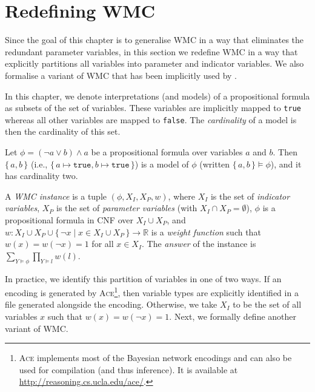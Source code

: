\section{Redefining WMC}

Since the goal of this chapter is to generalise WMC in a way that eliminates the
redundant parameter variables, in this section we redefine WMC in a way that
explicitly partitions all variables into parameter and indicator variables. We
also formalise a variant of WMC that has been implicitly used by
\citet{DBLP:conf/ijcai/ChaviraD05,DBLP:conf/sat/ChaviraD06}.

In this chapter, we denote interpretations (and models) of a propositional
formula as subsets of the set of variables. These variables are implicitly
mapped to \texttt{true} whereas all other variables are mapped to
\texttt{false}. The \emph{cardinality} of a model is then the cardinality of
this set.

\begin{example}
  Let $\phi = (\neg a \lor b) \land a$ be a propositional formula over variables
  $a$ and $b$. Then $\{\, a, b \,\}$ (i.e.,
  $\{\, a \mapsto \texttt{true}, b \mapsto \texttt{true} \,\}$) is a model of
  $\phi$ (written $\{\, a, b \,\} \models \phi$), and it has cardinality two.
\end{example}

\begin{definition}[WMC]\label{def:wmc}
  A \emph{WMC instance} is a tuple $(\phi, X_I, X_P, w)$, where $X_I$ is the set
  of \emph{indicator variables}, $X_P$ is the set of \emph{parameter variables}
  (with $X_I \cap X_P = \emptyset$), $\phi$ is a propositional formula in CNF
  over $X_I \cup X_P$, and
  $w\colon X_I \cup X_P \cup \{\, \neg x \mid x \in X_I \cup X_P \,\} \to \mathbb{R}$
  is a \emph{weight function} such that $w(x) = w(\neg x) = 1$ for all
  $x \in X_I$. The \emph{answer} of the instance is
  $\sum_{Y \models \phi} \prod_{Y \models l} w(l)$.
\end{definition}

In practice, we identify this partition of variables in one of two ways. If an
encoding is generated by \textsc{Ace}\footnote{\textsc{Ace}
  \citep{DBLP:journals/ai/ChaviraD08} implements most of the Bayesian network
  encodings and can also be used for compilation (and thus inference). It is
  available at \url{http://reasoning.cs.ucla.edu/ace/}.}, then variable types
are explicitly identified in a file generated alongside the encoding. Otherwise,
we take $X_I$ to be the set of all variables $x$ such that
$w(x) = w(\neg x) = 1$. Next, we formally define another variant of WMC.

